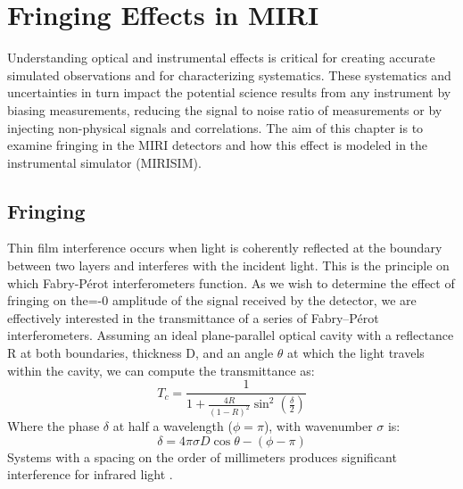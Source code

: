 \chapter{Fringing Effects in MIRI}\label{ch:fringe}
Understanding optical and instrumental effects is critical for creating accurate simulated observations and for characterizing systematics. 
These systematics and uncertainties in turn impact the potential science results from any instrument by biasing measurements, reducing the signal to noise ratio of measurements or by injecting non-physical signals and correlations.
The aim of this chapter is to examine fringing in the MIRI detectors and how this effect is modeled in the instrumental simulator (MIRISIM). 

\section{Fringing}
Thin film interference occurs when light is coherently reflected at the boundary between two layers and interferes with the incident light.
This is the principle on which Fabry-P\'{e}rot interferometers function.
As we wish to determine the effect of fringing on the=-0 amplitude of the signal received by the detector, we are effectively interested in the transmittance of a series of Fabry--P\'{e}rot interferometers. 
Assuming an ideal plane-parallel optical cavity with a reflectance R at both boundaries, thickness D, and an angle $\theta$ at which the light travels within the cavity, we can compute the transmittance as:
\begin{equation}\label{eqn:trans}
T_{c} = \frac{1}{1+\frac{4R}{\left(1-R\right)^{2}}\sin^{2}\left(\frac{\delta}{2}\right)}
\end{equation}
Where the phase $\delta$ at half a wavelength ($\phi = \pi$), with wavenumber $\sigma$ is:
\begin{equation}\label{eqn:phase}
\delta = 4\pi\sigma D \cos\theta - (\phi - \pi)
\end{equation}
Systems with a spacing on the order of millimeters produces significant interference for infrared light \parencite{Lahuis2003}.

